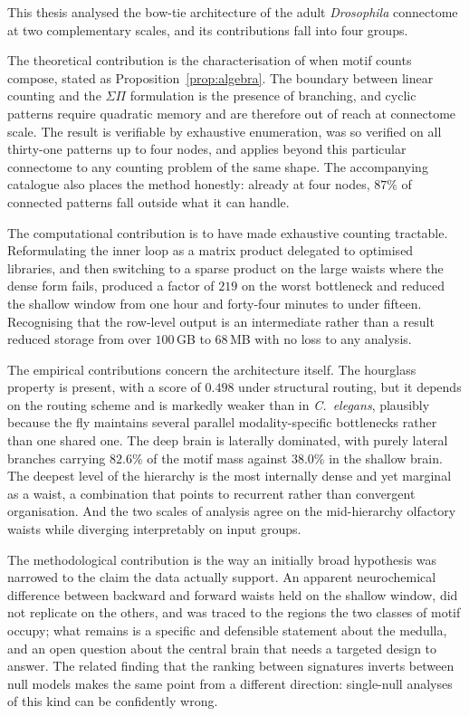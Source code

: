 \documentclass[12pt,a4paper,oneside]{article}
\theoremstyle{definition}
\theoremstyle{plain}
\newcommand{\Dros}{\textit{Drosophila}}
\newcommand{\sigmapi}{\ensuremath{\Sigma\Pi}}
\begin{document}
This thesis analysed the bow-tie architecture of the adult \Dros{}
connectome at two complementary scales, and its contributions fall into four
groups.

The theoretical contribution is the characterisation of when motif counts
compose, stated as Proposition~\ref{prop:algebra}. The boundary between
linear counting and the \sigmapi{} formulation is the presence of branching,
and cyclic patterns require quadratic memory and are therefore out of reach
at connectome scale. The result is verifiable by exhaustive enumeration, was
so verified on all thirty-one patterns up to four nodes, and applies beyond
this particular connectome to any counting problem of the same shape. The
accompanying catalogue also places the method honestly: already at four
nodes, $87\%$ of connected patterns fall outside what it can handle.

The computational contribution is to have made exhaustive counting
tractable. Reformulating the inner loop as a matrix product delegated to
optimised libraries, and then switching to a sparse product on the large
waists where the dense form fails, produced a factor of $219$ on the worst
bottleneck and reduced the shallow window from one hour and forty-four
minutes to under fifteen. Recognising that the row-level output is an
intermediate rather than a result reduced storage from over $100$\,GB to
$68$\,MB with no loss to any analysis.

The empirical contributions concern the architecture itself. The hourglass
property is present, with a score of $0.498$ under structural routing, but
it depends on the routing scheme and is markedly weaker than in
\textit{C.\ elegans}, plausibly because the fly maintains several parallel
modality-specific bottlenecks rather than one shared one. The deep brain is
laterally dominated, with purely lateral branches carrying $82.6\%$ of the
motif mass against $38.0\%$ in the shallow brain. The deepest level of the
hierarchy is the most internally dense and yet marginal as a waist, a
combination that points to recurrent rather than convergent organisation.
And the two scales of analysis agree on the mid-hierarchy olfactory waists
while diverging interpretably on input groups.

The methodological contribution is the way an initially broad hypothesis was
narrowed to the claim the data actually support. An apparent neurochemical
difference between backward and forward waists held on the shallow window,
did not replicate on the others, and was traced to the regions the two
classes of motif occupy; what remains is a specific and defensible statement
about the medulla, and an open question about the central brain that needs a
targeted design to answer. The related finding that the ranking between
signatures inverts between null models makes the same point from a different
direction: single-null analyses of this kind can be confidently wrong.
\end{document}
